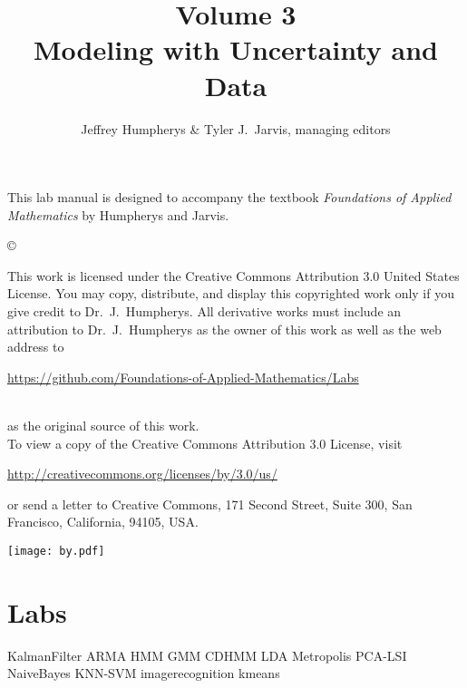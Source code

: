 \documentclass[opener-c,labs,yellow,nociteref]{HJnewsiambook}
\title{Volume 3\\ Modeling with Uncertainty and Data}
\author{Jeffrey Humpherys \& Tyler J.~Jarvis, managing editors}
\begin{document}

\thispagestyle{empty} %
\maketitle
\thispagestyle{empty}
\frontmatter



\begin{thepreface} %

This lab manual is designed to accompany the textbook \emph{Foundations of Applied Mathematics} by Humpherys and Jarvis.

\vfill
\copyright{This work is licensed under the Creative Commons Attribution 3.0 United States License.
You may copy, distribute, and display this copyrighted work only if you give credit to Dr.~J.~Humpherys.
All derivative works must include an attribution to Dr.~J.~Humpherys as the owner of this work as well as the web address to
\\\centerline{\url{https://github.com/Foundations-of-Applied-Mathematics/Labs}}\\as the original source of this work.
\\To view a copy of the Creative Commons Attribution 3.0 License, visit
\\\centerline{\url{http://creativecommons.org/licenses/by/3.0/us/}} or send a letter to Creative Commons, 171 Second Street, Suite 300, San Francisco, California, 94105, USA.}

\vfill
\centering\texttt{[image: by.pdf]}
\vfill
\end{thepreface}

\setcounter{tocdepth}{1}
\tableofcontents

\mainmatter %

\part{Labs} %
{KalmanFilter}
{ARMA}
{HMM}
{GMM}
{CDHMM}
{LDA}
{Metropolis}
{PCA-LSI}
{NaiveBayes}
{KNN-SVM}
{imagerecognition}
{kmeans}


\end{document}
